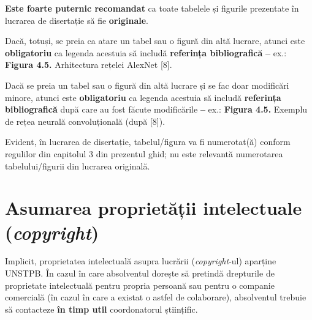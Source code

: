 \textbf{Este foarte puternic recomandat} ca toate tabelele și figurile prezentate în lucrarea de disertație să fie \textbf{originale}.

Dacă, totuși, se preia ca atare un tabel sau o figură din altă lucrare, atunci este \textbf{obligatoriu} ca legenda acestuia să includă \textbf{referința bibliografică} \textbf{--} ex.: \textbf{Figura 4.5.} Arhitectura rețelei AlexNet [8].

Dacă se preia un tabel sau o figură din altă lucrare și se fac doar modificări minore, atunci este \textbf{obligatoriu} ca legenda acestuia să includă \textbf{referința bibliografică} după care au fost făcute modificările \textbf{--} ex.: \textbf{Figura 4.5.} Exemplu de rețea neurală convoluțională (după [8]).

Evident, în lucrarea de disertație, tabelul/figura va fi numerotat(ă) conform regulilor din capitolul 3 din prezentul ghid; nu este relevantă numerotarea tabelului/figurii din lucrarea originală.

\section{Asumarea proprietății intelectuale (\textit{copyright})}
Implicit, proprietatea intelectuală asupra lucrării (\textit{copyright}-ul) aparține UNSTPB.
În cazul în care absolventul dorește să pretindă drepturile de proprietate intelectuală
pentru propria persoană sau pentru o companie comercială (în cazul în care a existat o astfel
de colaborare), absolventul trebuie să contacteze \textbf{în timp util} coordonatorul științific.


